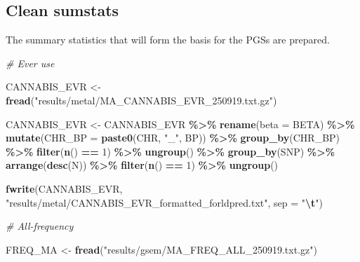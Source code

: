 \documentclass[
]{article}
\newenvironment{Shaded}{\begin{snugshade}}{\end{snugshade}}
\newcommand{\AttributeTok}[1]{\textcolor[rgb]{0.13,0.29,0.53}{#1}}
\newcommand{\CommentTok}[1]{\textcolor[rgb]{0.56,0.35,0.01}{\textit{#1}}}
\newcommand{\DecValTok}[1]{\textcolor[rgb]{0.00,0.00,0.81}{#1}}
\newcommand{\FunctionTok}[1]{\textcolor[rgb]{0.13,0.29,0.53}{\textbf{#1}}}
\newcommand{\NormalTok}[1]{#1}
\newcommand{\OtherTok}[1]{\textcolor[rgb]{0.56,0.35,0.01}{#1}}
\newcommand{\SpecialCharTok}[1]{\textcolor[rgb]{0.81,0.36,0.00}{\textbf{#1}}}
\newcommand{\StringTok}[1]{\textcolor[rgb]{0.31,0.60,0.02}{#1}}
\begin{document}
\hypertarget{clean-sumstats}{%
\subsection{Clean sumstats}\label{clean-sumstats}}

The summary statistics that will form the basis for the PGSs are
prepared.

\begin{Shaded}
\begin{Highlighting}[]
\CommentTok{\# Ever use}

\NormalTok{CANNABIS\_EVR }\OtherTok{\textless{}{-}} \FunctionTok{fread}\NormalTok{(}\StringTok{"results/metal/MA\_CANNABIS\_EVR\_250919.txt.gz"}\NormalTok{)}

\NormalTok{CANNABIS\_EVR }\OtherTok{\textless{}{-}}\NormalTok{ CANNABIS\_EVR }\SpecialCharTok{\%\textgreater{}\%} 
  \FunctionTok{rename}\NormalTok{(}\AttributeTok{beta =}\NormalTok{ BETA) }\SpecialCharTok{\%\textgreater{}\%} 
  \FunctionTok{mutate}\NormalTok{(}\AttributeTok{CHR\_BP =} \FunctionTok{paste0}\NormalTok{(CHR, }\StringTok{"\_"}\NormalTok{, BP)) }\SpecialCharTok{\%\textgreater{}\%} 
  \FunctionTok{group\_by}\NormalTok{(CHR\_BP) }\SpecialCharTok{\%\textgreater{}\%} 
  \FunctionTok{filter}\NormalTok{(}\FunctionTok{n}\NormalTok{() }\SpecialCharTok{==} \DecValTok{1}\NormalTok{) }\SpecialCharTok{\%\textgreater{}\%} 
  \FunctionTok{ungroup}\NormalTok{() }\SpecialCharTok{\%\textgreater{}\%} 
  \FunctionTok{group\_by}\NormalTok{(SNP) }\SpecialCharTok{\%\textgreater{}\%} 
  \FunctionTok{arrange}\NormalTok{(}\FunctionTok{desc}\NormalTok{(N)) }\SpecialCharTok{\%\textgreater{}\%} 
  \FunctionTok{filter}\NormalTok{(}\FunctionTok{n}\NormalTok{() }\SpecialCharTok{==} \DecValTok{1}\NormalTok{) }\SpecialCharTok{\%\textgreater{}\%} 
  \FunctionTok{ungroup}\NormalTok{() }

\FunctionTok{fwrite}\NormalTok{(CANNABIS\_EVR, }\StringTok{"results/metal/CANNABIS\_EVR\_formatted\_forldpred.txt"}\NormalTok{, }\AttributeTok{sep =} \StringTok{"}\SpecialCharTok{\textbackslash{}t}\StringTok{"}\NormalTok{)}

\CommentTok{\# All{-}frequency}

\NormalTok{FREQ\_MA }\OtherTok{\textless{}{-}} \FunctionTok{fread}\NormalTok{(}\StringTok{"results/gsem/MA\_FREQ\_ALL\_250919.txt.gz"}\NormalTok{)}


\end{Highlighting}
\end{Shaded}
\end{document}
